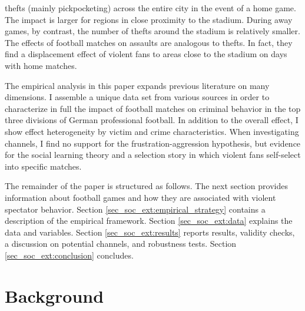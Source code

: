 thefts (mainly pickpocketing) across the entire city in the event of a home game. The impact is larger for regions in close proximity to the stadium. During away games, by contrast, the number of thefts around the stadium is relatively smaller. The effects of football matches on assaults are analogous to thefts. In fact, they find a displacement effect of violent fans to areas close to the stadium on days with home matches.




The empirical analysis in this paper expands previous literature on many dimensions. I assemble a unique data set from various sources in order to characterize in full the impact of football matches on criminal behavior in the top three divisions of German professional football. In addition to the overall effect, I show effect heterogeneity by victim and crime characteristics. When investigating channels, I find no support for the frustration-aggression hypothesis, but evidence for the social learning theory and a selection story in which violent fans self-select into specific matches.





The remainder of the paper is structured as follows. The next section provides information about football games and how they are associated with violent spectator behavior. Section \ref{sec_soc_ext:empirical_strategy} contains a description of the empirical framework. Section \ref{sec_soc_ext:data} explains the data and variables. Section \ref{sec_soc_ext:results} reports results, validity checks, a discussion on potential channels, and robustness tests. Section \ref{sec_soc_ext:conclusion} concludes.






\bigskip
\section{Background}\label{sec_soc_ext:background}




